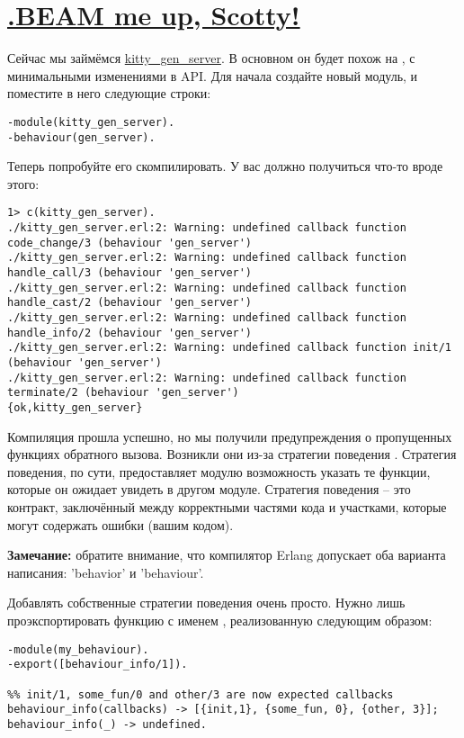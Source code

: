 \section{\href{https://en.wikipedia.org/wiki/Beam\_me\_up,\_Scotty}{.BEAM me up, Scotty!}}
\label{beam-me-up-scotty}
Сейчас мы займёмся \href{http://learnyousomeerlang.com/static/erlang/kitty_gen_server.erl}{kitty\_gen\_server}.
В основном он будет похож на , с минимальными изменениями в API.
Для начала создайте новый модуль, и поместите в него следующие строки:
\begin{lstlisting}[style=erlang]
-module(kitty_gen_server).
-behaviour(gen_server).
\end{lstlisting}
Теперь попробуйте его скомпилировать.
У вас должно получиться что\--то вроде этого:
\begin{lstlisting}[style=erlang]
1> c(kitty_gen_server).
./kitty_gen_server.erl:2: Warning: undefined callback function code_change/3 (behaviour 'gen_server')
./kitty_gen_server.erl:2: Warning: undefined callback function handle_call/3 (behaviour 'gen_server')
./kitty_gen_server.erl:2: Warning: undefined callback function handle_cast/2 (behaviour 'gen_server')
./kitty_gen_server.erl:2: Warning: undefined callback function handle_info/2 (behaviour 'gen_server')
./kitty_gen_server.erl:2: Warning: undefined callback function init/1 (behaviour 'gen_server')
./kitty_gen_server.erl:2: Warning: undefined callback function terminate/2 (behaviour 'gen_server')
{ok,kitty_gen_server}
\end{lstlisting}

Компиляция прошла успешно, но мы получили предупреждения о пропущенных функциях обратного вызова.
Возникли они из\--за стратегии поведения .
Стратегия поведения, по сути, предоставляет модулю возможность указать те функции, которые он ожидает увидеть в другом модуле.
Стратегия поведения \--- это контракт, заключённый между корректными частями кода и участками, которые могут содержать ошибки (вашим кодом).

\colorbox{lgray}
{
\begin{minipage}{1.0\linewidth}
    \textbf{Замечание:} обратите внимание, что компилятор Erlang допускает оба варианта написания: 'behavior' и 'behaviour'.
\end{minipage}
}

Добавлять собственные стратегии поведения очень просто.
Нужно лишь проэкспортировать функцию с именем , реализованную следующим образом:
\begin{lstlisting}[style=erlang]
-module(my_behaviour).
-export([behaviour_info/1]).
 
%% init/1, some_fun/0 and other/3 are now expected callbacks
behaviour_info(callbacks) -> [{init,1}, {some_fun, 0}, {other, 3}];
behaviour_info(_) -> undefined.
\end{lstlisting}


